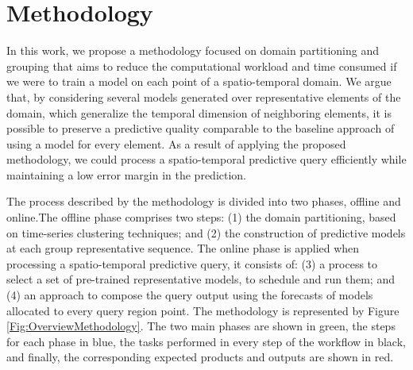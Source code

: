 \chapter[Methodology]{Methodology}
\label{Chapter:Methodology}

In this work, we propose a methodology focused on domain partitioning and grouping that aims to reduce the computational workload and time consumed if we were to train a model on each point of a spatio-temporal domain. We argue that, by considering several models generated over representative elements of the domain, which generalize the temporal dimension of neighboring elements, it is possible to preserve a predictive quality comparable to the baseline approach of using a model for every element. As a result of applying the proposed methodology, we could process a spatio-temporal predictive query efficiently while maintaining a low error margin in the prediction.

The process described by the methodology is divided into two phases, offline and online.The offline phase comprises two steps: (1) the domain partitioning, based on time-series clustering techniques; and (2) the construction of predictive models at each group representative sequence. The online phase is applied when processing a spatio-temporal predictive query, it consists of: (3) a process to select a set of pre-trained representative models, to schedule and run them; and (4) an approach to compose the query output using the forecasts of models allocated to every query region point. The methodology is represented by Figure \ref{Fig:OverviewMethodology}. The two main phases are shown in green, the steps for each phase in blue, the tasks performed in every step of the workflow in black, and finally, the corresponding expected products and outputs are shown in red. 


